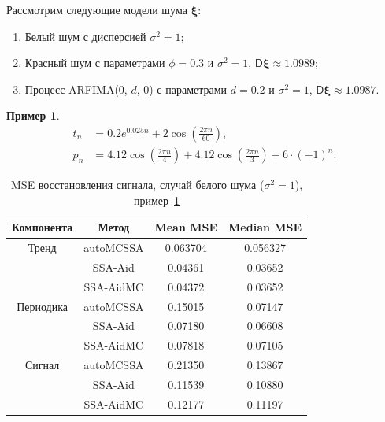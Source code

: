 \documentclass[specialist,
substylefile = spbu_report.rtx,
subf,12pt]{disser}
\theoremstyle{definition}
\newtheorem{example}{Пример}[chapter]
\begin{document}
Рассмотрим следующие модели шума $\bm\xi$:
\begin{enumerate}
	\item Белый шум с дисперсией $\sigma^2=1$;
	\item Красный шум с параметрами $\phi=0.3$ и $\sigma^2=1$, $\mathsf{D}\bm\xi\approx1.0989$;
	\item Процесс ARFIMA(0, $d$, 0) с параметрами $d=0.2$ и $\sigma^2=1$, $\mathsf{D}\bm\xi\approx1.0987$.
\end{enumerate}

\begin{example}\label{eg:signal1}
	\begin{align*}
		t_n & =0.2 e^{0.025n} + 2\cos\left(\frac{2\pi n}{60}\right),                                            \\
		p_n & =4.12\cos\left(\frac{2\pi n}{4}\right) + 4.12\cos\left(\frac{2\pi n}{3}\right) + 6\cdot (-1)^{n}.
	\end{align*}

	\begin{table}[h!]
        \centering
		\caption{MSE восстановления сигнала, случай белого шума ($\sigma^2=1$), пример~\ref{eg:signal1}}
	\label{tab:mse_signal1_wn}
        \begin{tabular}{c|c|c|c}
			Компонента & Метод & Mean MSE & Median MSE \\
			\hline
			Тренд & autoMCSSA & 0.063704 & 0.056327 \\
			& SSA-Aid & 0.04361  & 0.03652 \\
			& SSA-AidMC & 0.04372  & 0.03652 \\
			\hline
			Периодика & autoMCSSA & 0.15015  & 0.07147 \\
			& SSA-Aid & 0.07180  & 0.06608 \\
			& SSA-AidMC & 0.07818  & 0.07105 \\
			\hline
			Сигнал & autoMCSSA & 0.21350  & 0.13867 \\
			& SSA-Aid & 0.11539  & 0.10880 \\
			& SSA-AidMC & 0.12177  & 0.11197 \\
			\hline
		\end{tabular}
    \end{table}


\end{example}
\end{document}
